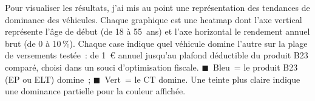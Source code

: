 \documentclass[20pt]{extarticle}
\begin{document}
\vspace{8pt}

\begin{tcolorbox}[sectionbox, title=Visualisation des résultats]
Pour visualiser les r\'esultats, j'ai mis au point une repr\'esentation des tendances de dominance 
des v\'ehicules. Chaque graphique est une heatmap dont l'axe 
vertical repr\'esente l'\^age de d\'ebut (de 18 \`a 55~ans) et l'axe horizontal le rendement annuel brut (de 0 \`a 10\,\%). 
Chaque case indique quel v\'ehicule domine l'autre sur la plage de versements test\'ee~: de 1~\euro{} annuel jusqu'au plafond d\'eductible 
du produit B23 compar\'e, choisi dans un souci d'optimisation fiscale. \textcolor{b23color}{$\blacksquare$}~Bleu~= le produit B23 (EP ou ELT) 
domine~; \textcolor{ctcolor}{$\blacksquare$}~Vert~= le CT domine. Une teinte plus claire indique une dominance partielle 
pour la couleur affichée.
\end{tcolorbox}

\vspace{8pt}
\end{document}
